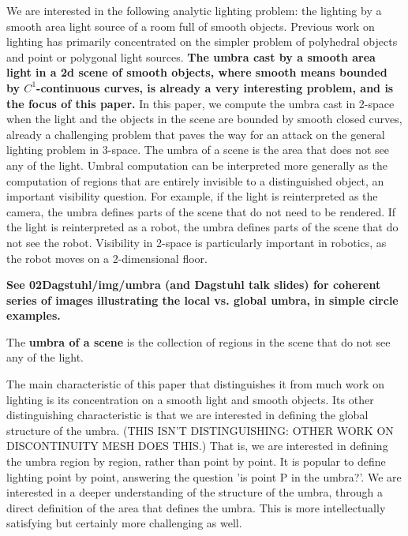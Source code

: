 \documentclass[9pt,twocolumn]{article}
\begin{document}
We are interested in the following analytic lighting problem:
the lighting by a smooth area light source 
of a room full of smooth objects.
Previous work on lighting has primarily concentrated on the simpler problem of
polyhedral objects and point or polygonal light sources.
{\bf The umbra cast by a smooth area light in a 2d scene
of smooth objects, where smooth means bounded by $C^1$-continuous curves,
is already a very interesting problem, and is the focus of this paper.}
In this paper, we compute the umbra cast in 2-space 
when the light and the objects %
in the scene are bounded by smooth closed curves,
already a challenging problem that paves the way for an attack 
on the general lighting problem in 3-space.
The umbra of a scene is the area that does not see any of the light.
Umbral computation can be interpreted
more generally as the computation of regions that are entirely invisible
to a distinguished object, an important visibility question.
For example, if the light is reinterpreted as the camera,
the umbra defines parts of the scene that do not need to be rendered.
If the light is reinterpreted as a robot, the umbra defines parts of the
scene that do not see the robot.
Visibility in 2-space is particularly important in robotics, as the robot
moves on a 2-dimensional floor.

{\bf See 02Dagstuhl/img/umbra (and Dagstuhl talk slides) for coherent series of images illustrating 
the local vs. global umbra, in simple circle examples.}


	\begin{defn2}
	The {\bf umbra of a scene} is the collection of regions 
	in the scene that do not see any of the light.
	\end{defn2}

The main characteristic of this paper that distinguishes it from much work on
lighting is its concentration on a smooth light and smooth objects.
Its other distinguishing characteristic is that we are interested in 
defining the global structure of the umbra.
(THIS ISN'T DISTINGUISHING: OTHER WORK ON DISCONTINUITY MESH DOES THIS.)
That is, we are interested in defining the umbra region by region,
rather than point by point.
It is popular to define lighting point by point,
answering the question 'is point P in the umbra?'.
We are interested in a deeper understanding of the structure of the umbra,
through a direct definition of the area that defines the umbra.
This is more intellectually satisfying but certainly more challenging as well.
\end{document}
